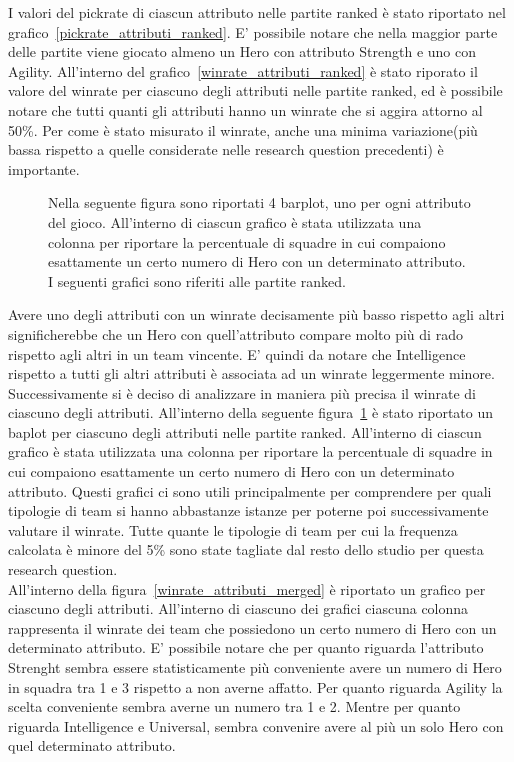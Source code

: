 I valori del pickrate di ciascun attributo nelle partite ranked è stato riportato nel grafico~\ref{pickrate_attributi_ranked}. E' possibile notare che nella maggior parte delle partite viene giocato almeno un Hero con attributo Strength e uno con Agility. All'interno del grafico~\ref{winrate_attributi_ranked} è stato riporato il valore del winrate per ciascuno degli attributi nelle partite ranked, ed è possibile notare che tutti quanti gli attributi hanno un winrate che si aggira attorno al 50\%. Per come è stato misurato il winrate, anche una minima variazione(più bassa rispetto a quelle considerate nelle research question precedenti) è importante.
\begin{figure}[htbp]
\begin{center}

\caption{Nella seguente figura sono riportati 4 barplot, uno per ogni attributo del gioco. All'interno di ciascun grafico è stata utilizzata una colonna per riportare la percentuale di squadre in cui compaiono esattamente un certo numero di Hero con un determinato attributo. I seguenti grafici sono riferiti alle partite ranked. }
\label{pickrate_attributi_merged}
\end{center}
\end{figure}
Avere uno degli attributi con un winrate decisamente più basso rispetto agli altri significherebbe che un Hero con quell'attributo compare molto più di rado rispetto agli altri in un team vincente. E' quindi da notare che Intelligence rispetto a tutti gli altri attributi è associata ad un winrate leggermente minore. \\
Successivamente si è deciso di analizzare in maniera più precisa il winrate di ciascuno degli attributi. All'interno della seguente figura~\ref{pickrate_attributi_merged} è stato riportato un baplot per ciascuno degli attributi nelle partite ranked. All'interno di ciascun grafico è stata utilizzata una colonna per riportare la percentuale di squadre in cui compaiono esattamente un certo numero di Hero con un determinato attributo.  Questi grafici ci sono utili principalmente per comprendere per quali tipologie di team si hanno abbastanze istanze per poterne poi successivamente valutare il winrate. Tutte quante le tipologie di team per cui la frequenza calcolata è minore del 5\% sono state tagliate dal resto dello studio per questa research question. \\
All'interno della figura~\ref{winrate_attributi_merged} è riportato un grafico per ciascuno degli attributi. All'interno di ciascuno dei grafici ciascuna colonna rappresenta il winrate dei team che possiedono un certo numero di Hero con un determinato attributo. E' possibile notare che per quanto riguarda l'attributo Strenght sembra essere statisticamente più conveniente avere un numero di Hero in squadra tra 1 e 3 rispetto a non averne affatto. Per quanto riguarda Agility la scelta conveniente sembra averne un numero tra 1 e 2. Mentre per quanto riguarda Intelligence e Universal, sembra convenire avere al più un solo Hero con quel determinato attributo. \\
